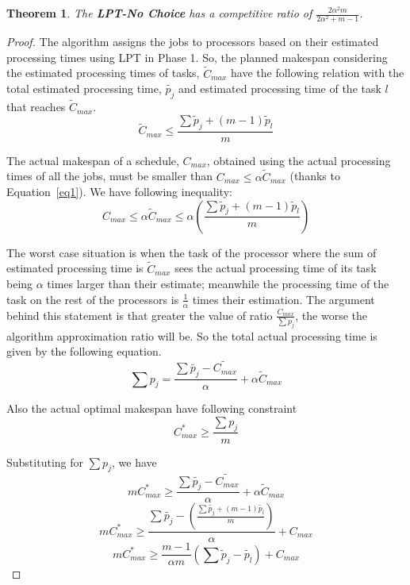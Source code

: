 \documentclass[10pt, conference, compsocconf]{IEEEtran}
\newtheorem{theorem}{Theorem}
\begin{document}
\begin{theorem}
\label{th:strat1-ub}
The \textbf{LPT-No Choice} has a competitive ratio of $ \frac{2\alpha^{2}m}{2\alpha^{2}+ m-1}$.
\end{theorem} 

\begin{proof}
  The algorithm assigns the jobs to processors based on their
  estimated processing times using LPT in Phase 1. So, the
  planned makespan considering the estimated processing times of tasks,
  $\tilde{C}_{max}$ have the following relation with the total
  estimated processing time, $\tilde{p_j}$ and estimated processing
  time of the task  $l$ that reaches $\tilde{C}_{max}$.
\begin{equation}\label{eq2}
\tilde C_{max}\leq  \frac{\sum{\tilde p_j + (m-1) \tilde p_l} }{m}
\end{equation}

The actual makespan of a schedule, $C_{max}$, obtained using the
actual processing times of all the jobs, must be smaller than $C_{max} \leq \alpha
\tilde C_{max}$ (thanks to Equation~\ref{eq1}). We
have following inequality:
\begin{equation}\label{eq3}
  C_{max}\leq \alpha \tilde C_{max}\leq \alpha \left ( \frac{\sum{\tilde p_j + (m-1) \tilde p_l} }{m} \right )
\end{equation} 

The worst case situation is when the task of the processor where the
sum of estimated processing time is $\tilde C_{max}$ sees the actual
processing time of its task being $\alpha$ times larger than their
estimate; meanwhile the processing time of the task on the rest of the
processors is $\frac{1}{\alpha}$ times their estimation. The argument
behind this statement is that greater the value of ratio
$\frac{C_{max}}{\sum{p_j}}$, the worse the algorithm approximation
ratio will be. So the total actual processing time is
given by the following equation.
 \begin{equation}\label{eq4}
 \sum {p_j} = \frac{\sum \tilde{p_j}- \tilde{C_{max}}}{\alpha} + \alpha \tilde C_{max}
 \end{equation}
 
 Also the actual optimal makespan have following constraint
 \begin{equation}\nonumber 
C_{max}^{*}\geq \frac{\sum {p_j}}{m}
\end{equation}

Substituting for  $ \sum {p_j}$, we have
 \begin{equation}\nonumber 
 m C_{max}^{*}\geq \frac{\sum \tilde{p_j}- \tilde{C_{max}}}{\alpha} + \alpha \tilde C_{max}
 \end{equation} 
\begin{equation}\nonumber 
 m C_{max}^{*}\geq \frac{\sum \tilde{p_j} - \left( \frac{\sum{\tilde{p_j} + (m-1) \tilde{p_l} }}{m} \right )} {\alpha} + {C_{max}}
\end{equation}
\begin{equation}\nonumber
 m C_{max}^{*}\geq \frac{m-1}{\alpha m} \left( \sum \tilde p_j - \tilde{p_l} \right) + {C_{max}}
 \end{equation}


\end{proof}
\end{document}

